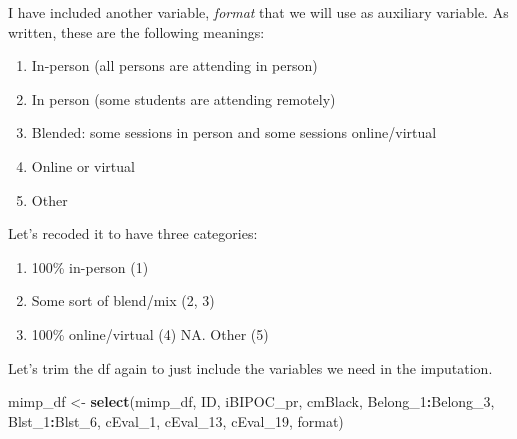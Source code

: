 \documentclass[
  11pt,
]{book}
\newenvironment{Shaded}{\begin{snugshade}}{\end{snugshade}}
\newcommand{\AttributeTok}[1]{\textcolor[rgb]{0.27,0.27,0.27}{#1}}
\newcommand{\CommentTok}[1]{\textcolor[rgb]{0.37,0.37,0.37}{\textit{#1}}}
\newcommand{\DecValTok}[1]{\textcolor[rgb]{0.06,0.06,0.06}{#1}}
\newcommand{\FunctionTok}[1]{\textcolor[rgb]{0.27,0.27,0.27}{\textbf{#1}}}
\newcommand{\NormalTok}[1]{#1}
\newcommand{\OtherTok}[1]{\textcolor[rgb]{0.37,0.37,0.37}{#1}}
\newcommand{\SpecialCharTok}[1]{\textcolor[rgb]{0.43,0.43,0.43}{\textbf{#1}}}
\newcommand{\StringTok}[1]{\textcolor[rgb]{0.5,0.5,0.5}{#1}}
\providecommand{\tightlist}{%
  \setlength{\itemsep}{0pt}\setlength{\parskip}{0pt}}
\begin{document}
I have included another variable, \emph{format} that we will use as auxiliary variable. As written, these are the following meanings:

\begin{enumerate}
\def\labelenumi{\arabic{enumi}.}
\tightlist
\item
  In-person (all persons are attending in person)
\item
  In person (some students are attending remotely)
\item
  Blended: some sessions in person and some sessions online/virtual
\item
  Online or virtual
\item
  Other
\end{enumerate}

Let's recoded it to have three categories:

\begin{enumerate}
\def\labelenumi{\arabic{enumi}.}
\setcounter{enumi}{-1}
\tightlist
\item
  100\% in-person (1)
\item
  Some sort of blend/mix (2, 3)
\item
  100\% online/virtual (4) NA. Other (5)
\end{enumerate}

\begin{Shaded}
\end{Shaded}

Let's trim the df again to just include the variables we need in the imputation.

\begin{Shaded}
\begin{Highlighting}[]
\NormalTok{mimp\_df }\OtherTok{\textless{}{-}} \FunctionTok{select}\NormalTok{(mimp\_df, ID, iBIPOC\_pr, cmBlack, Belong\_1}\SpecialCharTok{:}\NormalTok{Belong\_3, Blst\_1}\SpecialCharTok{:}\NormalTok{Blst\_6,}
\NormalTok{    cEval\_1, cEval\_13, cEval\_19, format)}
\end{Highlighting}
\end{Shaded}
\end{document}
